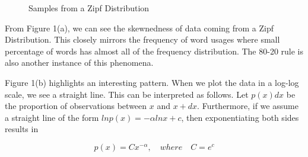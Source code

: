 \documentclass[12pt]{article}
\begin{document}
\begin{figure}[ht!]%
\centering
    \caption{Samples from a Zipf Distribution}%
    \label{fig:example}%
\end{figure}

From Figure 1(a), we can see the skewnedness of data coming from a Zipf Distribution. This closely mirrors the frequency of word usages where small percentage of words has almost all of the frequency distribution. The 80-20 rule is also another instance of this phenomena. 

Figure 1(b) highlights an interesting pattern. When we plot the data in a log-log scale, we see a straight line. This can be interpreted as follows. Let $p(x)dx$ be the proportion of observations between $x$ and $x + dx$. Furthermore, if we assume a straight line of the form $lnp(x) = -\alpha lnx+c$, then exponentiating both sides results in 

\begin{equation}
    p(x) = Cx^{-\alpha},\quad  where \quad C = e^c
\end{equation}
\end{document}
